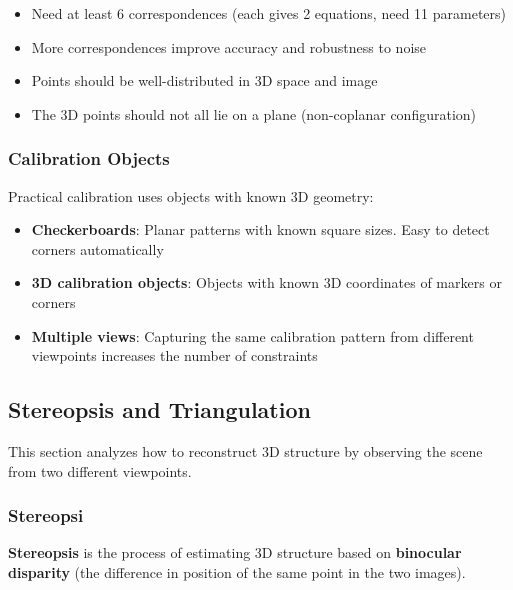 \documentclass[11pt,a4paper]{article}
\theoremstyle{definition}
\theoremstyle{plain}
\theoremstyle{remark}
\begin{document}
\begin{tcolorbox}[colback=yellow!10!white,colframe=yellow!75!black,title=\textbf{Calibration Requirements}]
\begin{itemize}
    \item Need at least 6 correspondences (each gives 2 equations, need 11 parameters)
    \item More correspondences improve accuracy and robustness to noise
    \item Points should be well-distributed in 3D space and image
    \item The 3D points should not all lie on a plane (non-coplanar configuration)
\end{itemize}
\end{tcolorbox}

\subsubsection{Calibration Objects}

Practical calibration uses objects with known 3D geometry:

\begin{itemize}
    \item \textbf{Checkerboards}: Planar patterns with known square sizes. Easy to detect corners automatically
    \item \textbf{3D calibration objects}: Objects with known 3D coordinates of markers or corners
    \item \textbf{Multiple views}: Capturing the same calibration pattern from different viewpoints increases the number of constraints
\end{itemize}

\subsection{Stereopsis and Triangulation}

This section analyzes how to reconstruct 3D structure by observing the scene from two different viewpoints.

\subsubsection{Stereopsi}

\textbf{Stereopsis} is the process of estimating 3D structure based on \textbf{binocular disparity} (the difference in position of the same point in the two images).
\end{document}
